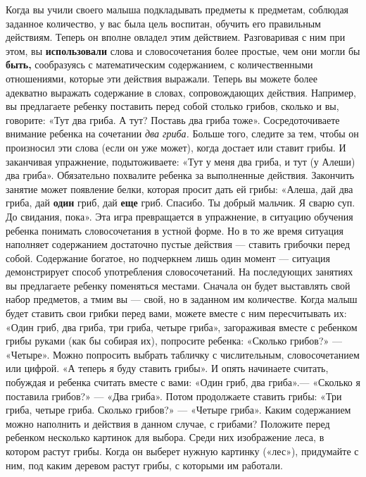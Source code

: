 \documentclass[a5paper]{book}
\renewcommand{\emph}[1]{\textit{#1}}
\begin{document}
Когда вы учили своего малыша подкладывать предметы к предметам, соблюдая
заданное количество, у вас была цель воспитан, обучить его правильным
действиям. Теперь он вполне овладел этим действием. Разговаривая с ним
при этом, вы \textbf{использовали} слова и словосочетания более простые,
чем они могли бы \textbf{быть,} сообразуясь с математическим
содержанием, с количественными отношениями, которые эти действия
выражали. Теперь вы можете более адекватно выражать содержание в словах,
сопровождающих действия. Например, вы предлагаете ребенку поставить
перед собой столько грибов, сколько и вы, говорите: «Тут два гриба. А
тут? Поставь два гриба тоже». Сосредоточиваете внимание ребенка на
сочетании \emph{два гриба.} Больше того, следите за тем, чтобы он
произносил эти слова (если он уже может), когда достает или ставит
грибы. И заканчивая упражнение, подытоживаете: «Тут у меня два гриба, и
тут (у Алеши) два гриба». Обязательно похвалите ребенка за выполненные
действия. Закончить занятие может появление белки, которая просит дать
ей грибы: «Алеша, дай два гриба, дай \textbf{один} гриб, дай
\textbf{еще} гриб. Спасибо. Ты добрый мальчик. Я сварю суп. До свидания,
пока». Эта игра превращается в упражнение, в ситуацию обучения ребенка
понимать словосочетания в устной форме. Но в то же время ситуация
наполняет содержанием достаточно пустые действия --- ставить грибочки
перед собой. Содержание богатое, но подчеркнем лишь один момент ---
ситуация демонстрирует способ употребления словосочетаний. На
последующих занятиях вы предлагаете ребенку поменяться местами. Сначала
он будет выставлять свой набор предметов, а тмим вы --- свой, но в
заданном им количестве. Когда малыш будет ставить свои грибки перед
вами, можете вместе с ним пересчитывать их: «Один гриб, два гриба, три
гриба, четыре гриба», загораживая вместе с ребенком грибы руками (как бы
собирая их), попросите ребенка: «Сколько грибов?» --- «Четыре». Можно
попросить выбрать табличку с числительным, словосочетанием или цифрой.
«А теперь я буду ставить грибы». И опять начинаете считать, побуждая и
ребенка считать вместе с вами: «Один гриб, два гриба».--- «Сколько я
поставила грибов?» --- «Два гриба». Потом продолжаете ставить грибы:
«Три гриба, четыре гриба. Сколько грибов?» --- «Четыре гриба». Каким
содержанием можно наполнить и действия в данном случае, с грибами?
Положите перед ребенком несколько картинок для выбора. Среди них
изображение леса, в котором растут грибы. Когда он выберет нужную
картинку («лес»), придумайте с ним, под каким деревом растут грибы, с
которыми им работали.
\end{document}
